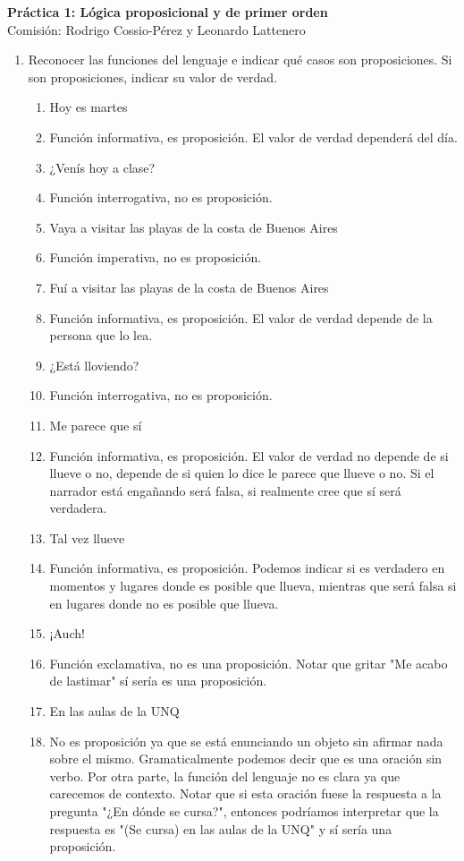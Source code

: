 \documentclass[a4paper]{article}
\newcommand{\Item}{\item[\stepcounter{enumii}$\blacktriangleright$\textbf{(\alph{enumii})}]} %
\newcommand{\answer}{\item[**]}
\newcommand{\exercise}{\item}
\begin{document}
\noindent \hrulefill 
\vspace{-7pt}
\begin{center} 
	\textbf{ Práctica 1: Lógica proposicional y de primer orden } \\
	Comisión: Rodrigo Cossio-Pérez y Leonardo Lattenero
\end{center}
\vspace{-10pt}
\hrulefill


\begin{enumerate}

	\exercise Reconocer las funciones del lenguaje e indicar qué casos son proposiciones. Si son proposiciones, indicar su valor de verdad.
	\begin{multicols}{2}
	\begin{enumerate} [label=(\alph*)]
		\Item Hoy es martes 
		\answer Función informativa, es proposición. El valor de verdad dependerá del día.

		\item ¿Venís hoy a clase?
		\answer Función interrogativa, no es proposición.

		\Item Vaya a visitar las playas de la costa de Buenos Aires
		\answer Función imperativa, no es proposición.

		\item Fuí a visitar las playas de la costa de Buenos Aires 
		\answer Función informativa, es proposición. El valor de verdad depende de la persona que lo lea.

		\Item ¿Está lloviendo?
		\answer Función interrogativa, no es proposición.

		\Item Me parece que sí 
		\answer Función informativa, es proposición. El valor de verdad no depende de si llueve o no, depende de si quien lo dice le parece que llueve o no. Si el narrador está engañando será falsa, si realmente cree que sí será verdadera.

		\item Tal vez llueve
		\answer Función informativa, es proposición. Podemos indicar si es verdadero en momentos y lugares donde es posible que llueva, mientras que será falsa si en lugares donde no es posible que llueva.

		\item ¡Auch!
		\answer Función exclamativa, no es una proposición. Notar que gritar "Me acabo de lastimar" sí sería es una proposición.

		\Item En las aulas de la UNQ
		\answer No es proposición ya que se está enunciando un objeto sin afirmar nada sobre el mismo. Gramaticalmente podemos decir que es una oración sin verbo. Por otra parte, la función del lenguaje no es clara ya que carecemos de contexto. Notar que si esta oración fuese la respuesta a la pregunta "¿En dónde se cursa?", entonces podríamos interpretar que la respuesta es "(Se cursa) en las aulas de la UNQ" y sí sería una proposición.


\end{enumerate}
\end{multicols}
\end{enumerate}
\end{document}
